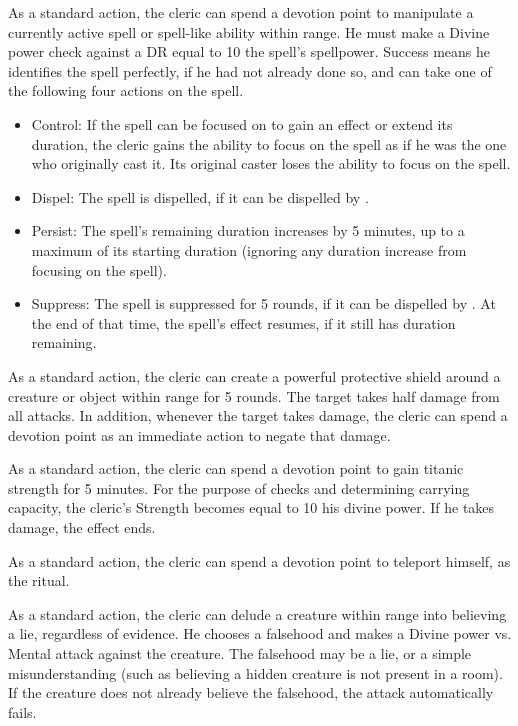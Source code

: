     As a standard action, the cleric can spend a devotion point to manipulate a currently active spell or spell-like ability within \rngmed range.
    He must make a Divine power check against a DR equal to 10 \add the spell's spellpower.
    Success means he identifies the spell perfectly, if he had not already done so, and can take one of the following four actions on the spell.
    \begin{itemize}
        \item Control: If the spell can be focused on to gain an effect or extend its duration, the cleric gains the ability to focus on the spell as if he was the one who originally cast it.
            Its original caster loses the ability to focus on the spell.
        \item Dispel: The spell is dispelled, if it can be dispelled by .
        \item Persist: The spell's remaining duration increases by 5 minutes, up to a maximum of its starting duration (ignoring any duration increase from focusing on the spell).
        \item Suppress: The spell is suppressed for 5 rounds, if it can be dispelled by .
            At the end of that time, the spell's effect resumes, if it still has duration remaining.
    \end{itemize}

    As a standard action, the cleric can create a powerful protective shield around a creature or object within \rngclose range for 5 rounds.
    The target takes half damage from all attacks.
    In addition, whenever the target takes damage, the cleric can spend a devotion point as an immediate action to negate that damage.

    As a standard action, the cleric can spend a devotion point to gain titanic strength for 5 minutes.
    For the purpose of checks and determining carrying capacity, the cleric's Strength becomes equal to 10 \add his divine power.
    If he takes damage, the effect ends.

    As a standard action, the cleric can spend a devotion point to teleport himself, as the  ritual.

    As a standard action, the cleric can delude a creature within \rngmed range into believing a lie, regardless of evidence.
    He chooses a falsehood and makes a Divine power vs. Mental attack against the creature.
    The falsehood may be a lie, or a simple misunderstanding (such as believing a hidden creature is not present in a room).
    If the creature does not already believe the falsehood, the attack automatically fails.


